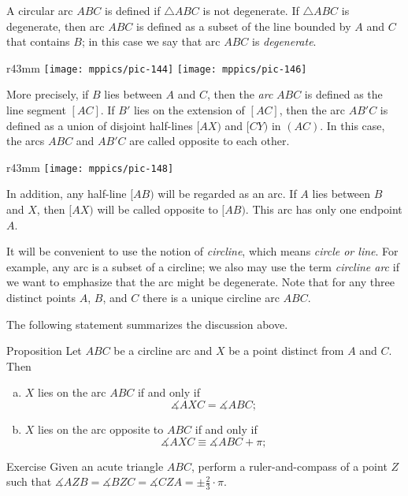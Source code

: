 A circular arc $ABC$ is defined if $\triangle ABC$ is not degenerate.
If $\triangle ABC$ is degenerate, then arc $ABC$ is defined as a subset of the line bounded by $A$ and $C$ that contains $B$;
in this case we say that arc $ABC$ is \emph{degenerate}.


\begin{wrapfigure}{r}{43mm}
\vskip-2mm
\centering
\texttt{[image: mppics/pic-144]}
\vskip4mm
\texttt{[image: mppics/pic-146]}
\end{wrapfigure}

More precisely, if $B$ lies between $A$ and $C$, then the {}\emph{arc} $ABC$ is defined as 
the line segment $[AC]$.
If $B'$ lies on the extension of $[AC]$,
then the arc $AB'C$ is defined as a union of disjoint half-lines $[AX)$ and $[CY)$ in $(AC)$.
In this case, the arcs $ABC$ and $AB'C$ are called opposite to each other.

\begin{wrapfigure}{r}{43mm}
\vskip-2mm
\centering
\texttt{[image: mppics/pic-148]}
\end{wrapfigure}

In addition, any half-line $[AB)$ will be regarded as an arc.
If $A$ lies between $B$ and $X$, then $[AX)$ will be called opposite to $[AB)$.
This arc has only one endpoint $A$.

It will be convenient to use the notion of 
\emph{circline},
which means \textit{circle or line}.
For example, any arc is a subset of a circline;
we also may use the term \emph{circline arc} if we want to emphasize that the arc might be degenerate.
Note that for any three distinct points $A$, $B$, and $C$ there is a unique circline arc $ABC$.

The following statement summarizes the discussion above.

\begin{thm}{Proposition}\label{prop:arcs}
Let $ABC$ be a circline arc and $X$ be a point distinct from $A$ and $C$.
Then 
\begin{enumerate}[(a)]
\item $X$ lies on the arc $ABC$ if and only if 
 \[\measuredangle AXC=\measuredangle ABC;\]
\item $X$ lies on the arc opposite to $ABC$ if and only if 
 \[\measuredangle AXC\equiv\measuredangle ABC+\pi;\]
\end{enumerate}
\end{thm}

\begin{thm}{Exercise}\label{ex:3x120}
Given an acute triangle $ABC$,
perform a ruler-and-compass of a point $Z$ such that
$\measuredangle AZB
= \measuredangle BZC
= \measuredangle CZA
=\pm\tfrac23\cdot\pi$.
\end{thm}

